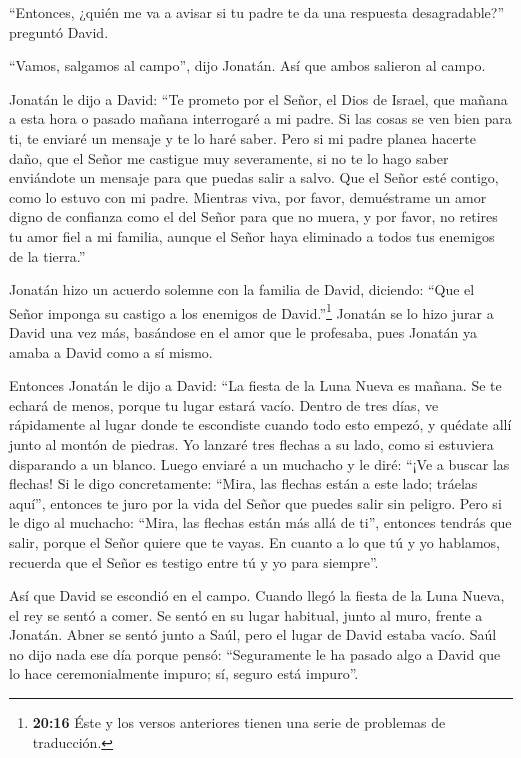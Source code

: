  ``Entonces, ¿quién me va a avisar si tu padre te da una
respuesta desagradable?'' preguntó David.

 ``Vamos, salgamos al campo'', dijo Jonatán. Así que ambos
salieron al campo.

 Jonatán le dijo a David: ``Te prometo por el Señor, el
Dios de Israel, que mañana a esta hora o pasado mañana interrogaré a mi
padre. Si las cosas se ven bien para ti, te enviaré un mensaje y te lo
haré saber.  Pero si mi padre planea hacerte daño, que el
Señor me castigue muy severamente, si no te lo hago saber enviándote un
mensaje para que puedas salir a salvo. Que el Señor esté contigo, como
lo estuvo con mi padre.  Mientras viva, por favor,
demuéstrame un amor digno de confianza como el del Señor para que no
muera,  y por favor, no retires tu amor fiel a mi familia,
aunque el Señor haya eliminado a todos tus enemigos de la tierra.''

 Jonatán hizo un acuerdo solemne con la familia de David,
diciendo: ``Que el Señor imponga su castigo a los enemigos de
David.''\footnote{\textbf{20:16} Éste y los versos anteriores tienen una
  serie de problemas de traducción.}  Jonatán se lo hizo
jurar a David una vez más, basándose en el amor que le profesaba, pues
Jonatán ya amaba a David como a sí mismo.

 Entonces Jonatán le dijo a David: ``La fiesta de la Luna
Nueva es mañana. Se te echará de menos, porque tu lugar estará vacío.
 Dentro de tres días, ve rápidamente al lugar donde te
escondiste cuando todo esto empezó, y quédate allí junto al montón de
piedras.  Yo lanzaré tres flechas a su lado, como si
estuviera disparando a un blanco.  Luego enviaré a un
muchacho y le diré: ``¡Ve a buscar las flechas! Si le digo
concretamente: ``Mira, las flechas están a este lado; tráelas aquí'',
entonces te juro por la vida del Señor que puedes salir sin peligro.
 Pero si le digo al muchacho: ``Mira, las flechas están más
allá de ti'', entonces tendrás que salir, porque el Señor quiere que te
vayas.  En cuanto a lo que tú y yo hablamos, recuerda que
el Señor es testigo entre tú y yo para siempre''.

 Así que David se escondió en el campo. Cuando llegó la
fiesta de la Luna Nueva, el rey se sentó a comer.  Se sentó
en su lugar habitual, junto al muro, frente a Jonatán. Abner se sentó
junto a Saúl, pero el lugar de David estaba vacío.  Saúl no
dijo nada ese día porque pensó: ``Seguramente le ha pasado algo a David
que lo hace ceremonialmente impuro; sí, seguro está impuro''.

